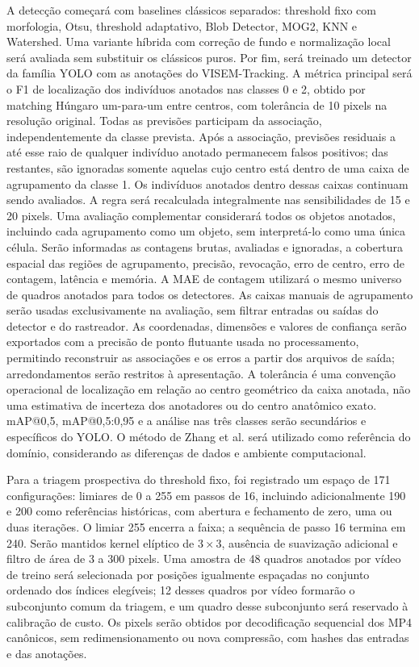 A detecção começará com baselines clássicos separados: threshold fixo com morfologia, Otsu, threshold adaptativo, Blob Detector, MOG2, KNN e Watershed. Uma variante híbrida com correção de fundo e normalização local será avaliada sem substituir os clássicos puros. Por fim, será treinado um detector da família YOLO com as anotações do VISEM-Tracking. A métrica principal será o F1 de localização dos indivíduos anotados nas classes 0 e 2, obtido por matching Húngaro um-para-um entre centros, com tolerância de 10 pixels na resolução original. Todas as previsões participam da associação, independentemente da classe prevista. Após a associação, previsões residuais a até esse raio de qualquer indivíduo anotado permanecem falsos positivos; das restantes, são ignoradas somente aquelas cujo centro está dentro de uma caixa de agrupamento da classe 1. Os indivíduos anotados dentro dessas caixas continuam sendo avaliados. A regra será recalculada integralmente nas sensibilidades de 15 e 20 pixels. Uma avaliação complementar considerará todos os objetos anotados, incluindo cada agrupamento como um objeto, sem interpretá-lo como uma única célula. Serão informadas as contagens brutas, avaliadas e ignoradas, a cobertura espacial das regiões de agrupamento, precisão, revocação, erro de centro, erro de contagem, latência e memória. A MAE de contagem utilizará o mesmo universo de quadros anotados para todos os detectores. As caixas manuais de agrupamento serão usadas exclusivamente na avaliação, sem filtrar entradas ou saídas do detector e do rastreador. As coordenadas, dimensões e valores de confiança serão exportados com a precisão de ponto flutuante usada no processamento, permitindo reconstruir as associações e os erros a partir dos arquivos de saída; arredondamentos serão restritos à apresentação. A tolerância é uma convenção operacional de localização em relação ao centro geométrico da caixa anotada, não uma estimativa de incerteza dos anotadores ou do centro anatômico exato. mAP@0,5, mAP@0,5:0,95 e a análise nas três classes serão secundários e específicos do YOLO. O método de Zhang et al. \cite{zhang2024spermyolo} será utilizado como referência do domínio, considerando as diferenças de dados e ambiente computacional.

Para a triagem prospectiva do threshold fixo, foi registrado um espaço de 171 configurações: limiares de 0 a 255 em passos de 16, incluindo adicionalmente 190 e 200 como referências históricas, com abertura e fechamento de zero, uma ou duas iterações. O limiar 255 encerra a faixa; a sequência de passo 16 termina em 240. Serão mantidos kernel elíptico de $3\times3$, ausência de suavização adicional e filtro de área de 3 a 300 pixels. Uma amostra de 48 quadros anotados por vídeo de treino será selecionada por posições igualmente espaçadas no conjunto ordenado dos índices elegíveis; 12 desses quadros por vídeo formarão o subconjunto comum da triagem, e um quadro desse subconjunto será reservado à calibração de custo. Os pixels serão obtidos por decodificação sequencial dos MP4 canônicos, sem redimensionamento ou nova compressão, com hashes das entradas e das anotações.

